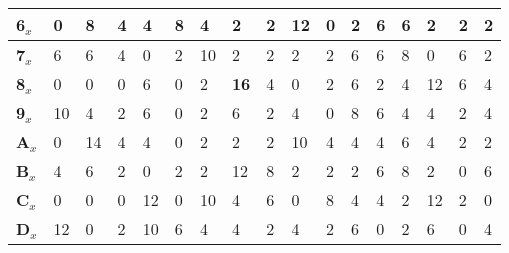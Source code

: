 \begin{longtable}[c]{|l|l|l|l|l|l|l|l|l|l|l|l|l|l|l|l|l|}
\textbf{6$_x$}  & 0              & 8              & 4              & 4              & 8              & 4              & 2              & 2              & 12             & 0              & 2              & 6              & 6              & 2              & 2              & 2              \\ \hline
\textbf{7$_x$}  & 6              & 6              & 4              & 0              & 2              & 10             & 2              & 2              & 2              & 2              & 6              & 6              & 8              & 0              & 6              & 2              \\ \hline
\textbf{8$_x$}  & 0              & 0              & 0              & 6              & 0              & 2              & \textbf{16}             & 4              & 0              & 2              & 6              & 2              & 4              & 12             & 6              & 4              \\ \hline
\textbf{9$_x$}  & 10             & 4              & 2              & 6              & 0              & 2              & 6              & 2              & 4              & 0              & 8              & 6              & 4              & 4              & 2              & 4              \\ \hline
\textbf{A$_x$}  & 0              & 14             & 4              & 4              & 0              & 2              & 2              & 2              & 10             & 4              & 4              & 4              & 6              & 4              & 2              & 2              \\ \hline
\textbf{B$_x$}  & 4              & 6              & 2              & 0              & 2              & 2              & 12             & 8              & 2              & 2              & 2              & 6              & 8              & 2              & 0              & 6              \\ \hline
\textbf{C$_x$}  & 0              & 0              & 0              & 12             & 0              & 10             & 4              & 6              & 0              & 8              & 4              & 4              & 2              & 12             & 2              & 0              \\ \hline
\textbf{D$_x$}  & 12             & 0              & 2              & 10             & 6              & 4              & 4              & 2              & 4              & 2              & 6              & 0              & 2              & 6              & 0              & 4              \\ \hline

\end{longtable}
